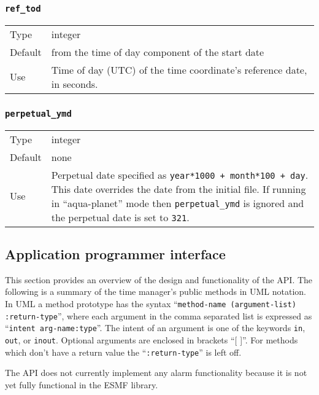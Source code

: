 \documentclass[12pt]{article}
\newcommand{\code}[1]{\texttt{#1}}
\begin{document}
\subsubsection{\code{ref\_tod}}

\begin{tabular}{lp{5.5in}}
Type    & integer \\
Default & from the time of day component of the start date \\
Use     &  
Time of day (UTC) of the time coordinate's reference date, in seconds.
\end{tabular}

\subsubsection{\code{perpetual\_ymd}}

\begin{tabular}{lp{5.5in}}
Type    & integer \\
Default & none \\
Use     &  
Perpetual date specified as \code{year*1000 + month*100 + day}.  This date
overrides the date from the initial file.  If running in ``aqua-planet''
mode then \code{perpetual\_ymd} is ignored and the perpetual date is set to
\code{321}.
\end{tabular}

\subsection{Application programmer interface}

This section provides an overview of the design and functionality of the
API.  The following is a summary of the time manager's public methods in
UML notation.  In UML a method prototype has the syntax ``\code{method-name
(argument-list) :return-type}'', where each argument in the comma separated
list is expressed as ``\code{intent arg-name:type}''.  The intent of an
argument is one of the keywords \code{in}, \code{out}, or \code{inout}.
Optional arguments are enclosed in brackets ``[ ]''.  For methods which
don't have a return value the ``\code{:return-type}'' is left off.

The API does not currently implement any alarm functionality because it is
not yet fully functional in the ESMF library.
\end{document}
